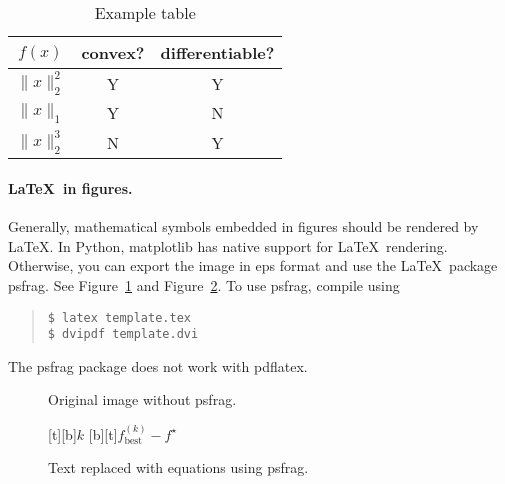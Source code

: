 \documentclass[12pt]{article}
\begin{document}
\begin{table}
\begin{minipage}{\textwidth}
\centering
\begin{tabular}{|c|c|c|}
\hline
$f(x)$      & convex? & differentiable? \\ \hline
$\|x\|_2^2$ & Y       & Y \\
$\|x\|_1$   & Y       & N \\
$\|x\|_2^3$ & N       & Y \\
\hline
\end{tabular}
\caption{Example table}
\label{t-ex1}
\end{minipage} 
\end{table}

\paragraph{\LaTeX\ in figures.}
Generally, mathematical symbols embedded in figures should be rendered by
\LaTeX. In Python, matplotlib has native support for \LaTeX\ rendering.
Otherwise, you can export the image in eps format and use the \LaTeX\ package
psfrag. See Figure~\ref{f-nopsfrag} and Figure~\ref{f-psfrag}. To use psfrag,
compile using
\begin{quote}
\begin{verbatim}
$ latex template.tex
$ dvipdf template.dvi
\end{verbatim}
\end{quote}
The psfrag package does not work with pdflatex.

\begin{figure}
\begin{center}
\end{center}
\caption{Original image without psfrag.}
\label{f-nopsfrag}
\end{figure}

\begin{figure}
\begin{center}
[t][b]{$k$}
[b][t]{$f_\mathrm{best}^{(k)} - f^\star$}
\end{center}
\caption{Text replaced with equations using psfrag.}
\label{f-psfrag}
\end{figure}
\end{document}
